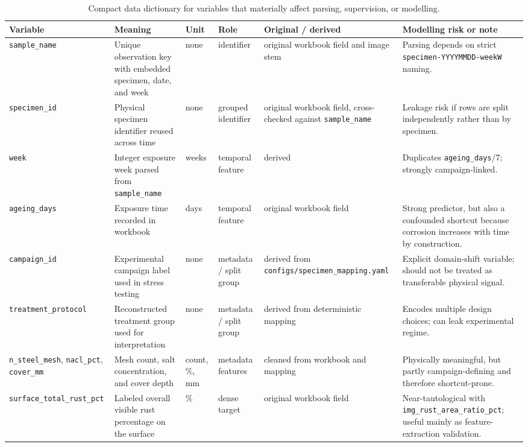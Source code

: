 \documentclass[10pt,a4paper,twocolumn]{article}
\begin{document}
\begin{table}[t]
\centering
\caption{Compact data dictionary for variables that materially affect parsing, supervision, or modelling.}
\label{tab:data-dictionary}
\scriptsize
\begin{tabularx}{\textwidth}{L{0.13\textwidth}L{0.17\textwidth}L{0.07\textwidth}L{0.11\textwidth}L{0.11\textwidth}Y}
\toprule
\textbf{Variable} & \textbf{Meaning} & \textbf{Unit} & \textbf{Role} & \textbf{Original / derived} & \textbf{Modelling risk or note} \\
\midrule
\texttt{sample\_name} & Unique observation key with embedded specimen, date, and week & none & identifier & original workbook field and image stem & Parsing depends on strict \texttt{specimen-YYYYMMDD-weekW} naming. \\
\texttt{specimen\_id} & Physical specimen identifier reused across time & none & grouped identifier & original workbook field, cross-checked against \texttt{sample\_name} & Leakage risk if rows are split independently rather than by specimen. \\
\texttt{week} & Integer exposure week parsed from \texttt{sample\_name} & weeks & temporal feature & derived & Duplicates \texttt{ageing\_days}/7; strongly campaign-linked. \\
\texttt{ageing\_days} & Exposure time recorded in workbook & days & temporal feature & original workbook field & Strong predictor, but also a confounded shortcut because corrosion increases with time by construction. \\
\texttt{campaign\_id} & Experimental campaign label used in stress testing & none & metadata / split group & derived from \texttt{configs/specimen\_mapping.yaml} & Explicit domain-shift variable; should not be treated as transferable physical signal. \\
\texttt{treatment\_protocol} & Reconstructed treatment group used for interpretation & none & metadata / split group & derived from deterministic mapping & Encodes multiple design choices; can leak experimental regime. \\
\texttt{n\_steel\_mesh}, \texttt{nacl\_pct}, \texttt{cover\_mm} & Mesh count, salt concentration, and cover depth & count, \%, mm & metadata features & cleaned from workbook and mapping & Physically meaningful, but partly campaign-defining and therefore shortcut-prone. \\
\texttt{surface\_total\_rust\_pct} & Labeled overall visible rust percentage on the surface & \% & dense target & original workbook field & Near-tautological with \texttt{img\_rust\_area\_ratio\_pct}; useful mainly as feature-extraction validation. \\

\end{tabularx}
\end{table}
\end{document}
